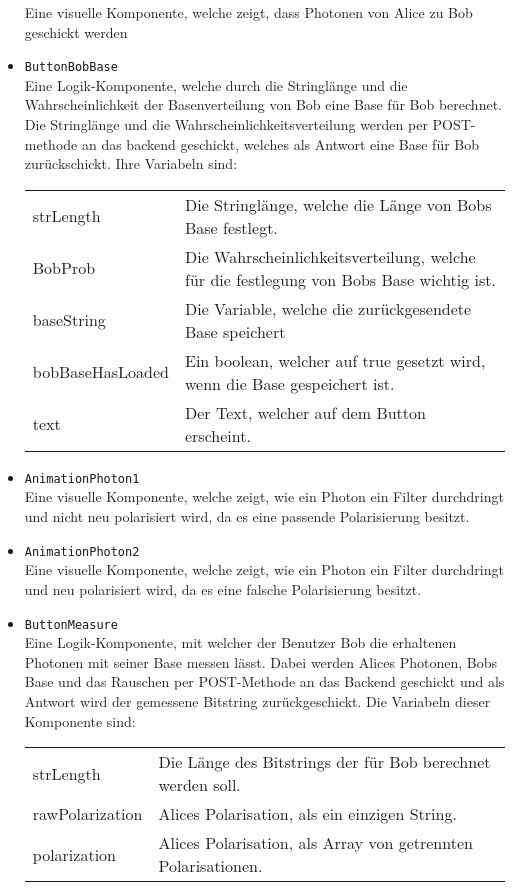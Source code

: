 \documentclass[a4paper,10.2pt,pdftex]{scrartcl}%
\begin{document}
\begin{itemize}
Eine visuelle Komponente, welche zeigt, dass Photonen von Alice zu Bob geschickt werden
\item \texttt{ButtonBobBase} \\
Eine Logik-Komponente, welche durch die Stringlänge und die Wahrscheinlichkeit der Basenverteilung von Bob eine Base für Bob berechnet. Die Stringlänge und die Wahrscheinlichkeitsverteilung werden per POST-methode an das backend geschickt, welches als Antwort eine Base für Bob zurückschickt. Ihre Variabeln sind: \\[3mm]
\begin{tabularx}{\textwidth}{p{3cm}p{11cm}} 
strLength & Die Stringlänge, welche die Länge von Bobs Base festlegt. \\
BobProb & Die Wahrscheinlichkeitsverteilung, welche für die festlegung von Bobs Base wichtig ist. \\
baseString & Die Variable, welche die zurückgesendete Base speichert \\
bobBaseHasLoaded & Ein boolean, welcher auf true gesetzt wird, wenn die Base gespeichert ist. \\
text & Der Text, welcher auf dem Button erscheint.
\end{tabularx}
\item \texttt{AnimationPhoton1} \\
Eine visuelle Komponente, welche zeigt, wie ein Photon ein Filter durchdringt und nicht neu polarisiert wird, da es eine passende Polarisierung besitzt.
\item \texttt{AnimationPhoton2} \\
Eine visuelle Komponente, welche zeigt, wie ein Photon ein Filter durchdringt und neu polarisiert wird, da es eine falsche Polarisierung besitzt.
\item \texttt{ButtonMeasure} \\
Eine Logik-Komponente, mit welcher der Benutzer Bob die erhaltenen Photonen mit seiner Base messen lässt. Dabei werden Alices Photonen, Bobs Base und das Rauschen per POST-Methode an das Backend geschickt und als Antwort wird der gemessene Bitstring zurückgeschickt. Die Variabeln dieser Komponente sind: \\[3mm]
\begin{tabularx}{\textwidth}{p{3cm}p{11cm}} 
strLength & Die Länge des Bitstrings der für Bob berechnet werden soll. \\
rawPolarization & Alices Polarisation, als ein einzigen String. \\
polarization & Alices Polarisation, als Array von getrennten Polarisationen. \\

\end{tabularx}
\end{itemize}
\end{document}
